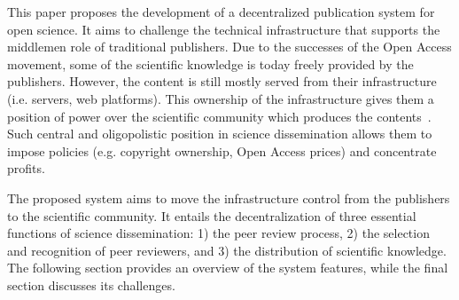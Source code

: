 This paper proposes the development of a decentralized publication system for
open science. It aims to challenge the technical infrastructure that supports
the middlemen role of traditional publishers. Due to the successes of the Open
Access movement, some of the scientific knowledge is today freely provided by
the publishers. However, the content is still mostly served from their
infrastructure (i.e. servers, web platforms). This ownership of the
infrastructure gives them a position of power over the scientific community
which produces the contents~\cite{fuster2010governance}. Such central and
oligopolistic position in science dissemination allows them to impose policies
(e.g. copyright ownership, Open Access prices) and concentrate profits.

The proposed system aims to move the infrastructure control from the publishers
to the scientific community. It entails the decentralization of three essential
functions of science dissemination: 1) the peer review process, 2) the selection
and recognition of peer reviewers, and 3) the distribution of scientific
knowledge. The following section provides an overview of the system features,
while the final section discusses its challenges.



